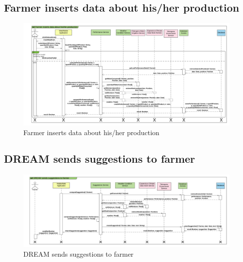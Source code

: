 \subsection{Farmer inserts data about his/her production}

\newpage
\begin{landscape}
\begin{figure}[h]
\vspace*{-2cm}
\noindent
\centering
\centerline{\includegraphics[scale= 0.108]{./Images/Sequence diagram/Farmer inserts data about his_her production.png}}
    \caption{Farmer inserts data about his/her production}
    \vspace*{-12cm}
\end{figure}
\fillandplacepagenumber
\end{landscape}


\subsection{DREAM sends suggestions to farmer}

\newpage
\begin{landscape}
\begin{figure}[h]
\vspace*{-2cm}
\noindent
\centering
\centerline{\includegraphics[scale= 0.108]{./Images/Sequence diagram/DREAM sends suggestions to farmer.png}}
    \caption{DREAM sends suggestions to farmer}
    \vspace*{-12cm}
\end{figure}
\fillandplacepagenumber
\end{landscape}

